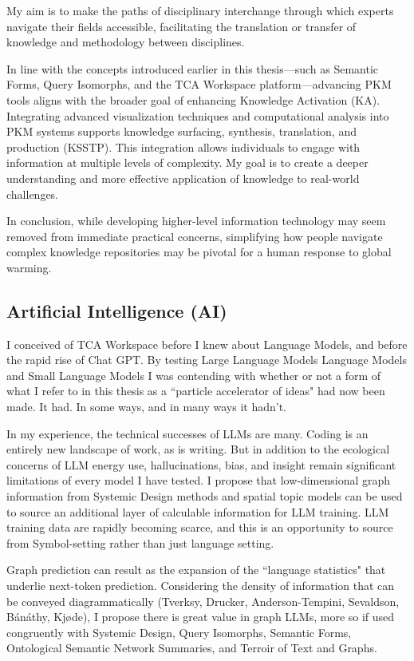My aim is to make the paths of disciplinary interchange through which experts navigate their fields accessible, facilitating the translation or transfer of knowledge and methodology between disciplines. 

In line with the concepts introduced earlier in this thesis—such as Semantic Forms, Query Isomorphs, and the TCA Workspace platform—advancing PKM tools aligns with the broader goal of enhancing Knowledge Activation (KA). Integrating advanced visualization techniques and computational analysis into PKM systems supports knowledge surfacing, synthesis, translation, and production (KSSTP). This integration allows individuals to engage with information at multiple levels of complexity. My goal is to create a deeper understanding and more effective application of knowledge to real-world challenges.

In conclusion, while developing higher-level information technology may seem removed from immediate practical concerns, simplifying how people navigate complex knowledge repositories may be pivotal for a human response to global warming.


\subsection{Artificial Intelligence (AI)}
I conceived of TCA Workspace before I knew about Language Models, and before the rapid rise of Chat GPT. By testing Large Language Models Language Models and Small Language Models I was contending with whether or not a form of what I refer to in this thesis as a ``particle accelerator of ideas" had now been made. It had. In some ways, and in many ways it hadn’t. 

In my experience, the technical successes of LLMs are many. Coding is an entirely new landscape of work, as is writing. But in addition to the ecological concerns of LLM energy use, hallucinations, bias, and insight remain significant limitations of every model I have tested. I propose that low-dimensional graph information from Systemic Design methods and spatial topic models can be used to source an additional layer of calculable information for LLM training. LLM training data are rapidly becoming scarce, and this is an opportunity to source from Symbol-setting rather than just language setting. 

Graph prediction can result as the expansion of the ``language statistics" \citep[p. 1]{shannon_prediction_1951} that underlie next-token prediction. Considering the density of information that can be conveyed diagrammatically (Tverksy, Drucker, Anderson-Tempini, Sevaldson, Bánáthy, Kjøde), I propose there is great value in graph LLMs, more so if used congruently with Systemic Design, Query Isomorphs, Semantic Forms, Ontological Semantic Network Summaries, and Terroir of Text and Graphs.

